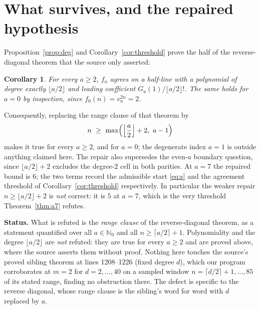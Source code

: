 \documentclass[11pt]{amsart}
\newtheorem{corollary}[theorem]{Corollary}
\theoremstyle{remark}
\newcommand{\N}{\mathbb{N}}
\begin{document}
\section{What survives, and the repaired hypothesis}

Proposition~\ref{prop:deg} and Corollary~\ref{cor:threshold} prove the half of
the reverse-diagonal theorem that the source only asserted:

\begin{corollary}
For every $a\ge2$, $f_a$ agrees on a half-line with a polynomial of degree
exactly $\lfloor a/2\rfloor$ and leading coefficient
$G_a(1)/\lfloor a/2\rfloor!$. The same holds for $a=0$ by inspection, since
$f_0(n)=v_n^{2n}=2$.
\end{corollary}

Consequently, replacing the range clause of that theorem by
\begin{equation}\label{eq:repair}
 n\ \ge\ \max\Bigl(\Bigl\lfloor \frac a2\Bigr\rfloor+2,\ a-1\Bigr)
\end{equation}
makes it true for every $a\ge2$, and for $a=0$; the degenerate index $a=1$ is
outside anything claimed here. The repair also supersedes the even-$a$
boundary question, since $\lfloor a/2\rfloor+2$ excludes the degree-$2$ cell in
both parities. At $a=7$ the repaired bound is $6$; the two terms record the
admissible start \eqref{eq:s} and the agreement threshold of
Corollary~\ref{cor:threshold} respectively. In particular
the weaker repair
$n\ge\lfloor a/2\rfloor+2$ is \emph{not} correct: it is $5$ at $a=7$, which is
the very threshold Theorem~\ref{thm:a7} refutes.

\medskip
\noindent\textbf{Status.}
What is refuted is the \emph{range clause} of the reverse-diagonal theorem, as
a statement quantified over all $a\in\N_0$ and all $n\ge\lceil a/2\rceil+1$.
Polynomiality and the degree $\lfloor a/2\rfloor$ are \emph{not} refuted: they
are true for every $a\ge2$ and are proved above, where the source asserts them
without proof. Nothing here touches the source's proved sibling theorem at lines
1208--1226 (fixed degree $d$), which our program corroborates at $m=2$ for
$d=2,\dots,40$ on a sampled window $n=\lceil d/2\rceil+1,\dots,85$ of its stated
range, finding no obstruction there. The defect is specific to the
reverse diagonal, whose range clause is the sibling's word for word with $d$
replaced by $a$.
\end{document}
